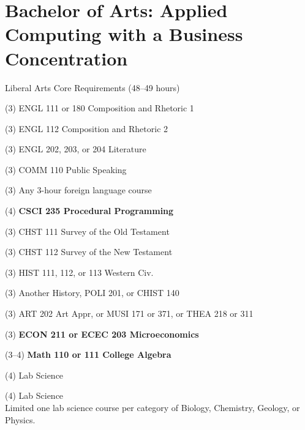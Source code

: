 %
\section*{Bachelor of Arts: Applied Computing with a Business Concentration}

\begin{reqgroup}{Liberal Arts Core Requirements (48--49 hours)}
\begin{checklist}
\begin{minipage}[t]{0.5\linewidth}
	\item (3) ENGL 111 or 180 Composition and Rhetoric 1
	\item (3) ENGL 112 Composition and Rhetoric 2
	\item (3) ENGL 202, 203, or 204 Literature
	\item (3) COMM 110 Public Speaking
	\item (3) Any 3-hour foreign language course
	\item (4) \textbf{CSCI 235  Procedural Programming}
	\item (3) CHST 111  Survey of the Old Testament
	\item (3) CHST 112  Survey of the New Testament
	\item (3) HIST 111, 112, or 113 Western Civ.
\end{minipage}
\begin{minipage}[t]{0.5\linewidth}
	\item (3)	Another History, POLI 201, or CHIST 140
	\item (3)	ART 202 Art Appr, or MUSI 171 or 371, or THEA 218 or 311
	\item (3)	\textbf{ECON 211 or ECEC 203 Microeconomics}
	\item (3--4)	\textbf{Math 110 or 111 College Algebra}
	\item (4)	Lab Science
	\item (4)	Lab Science\\Limited one lab science course per category of Biology, Chemistry,
Geology, or Physics.
\end{minipage}
\end{checklist}
\end{reqgroup}


